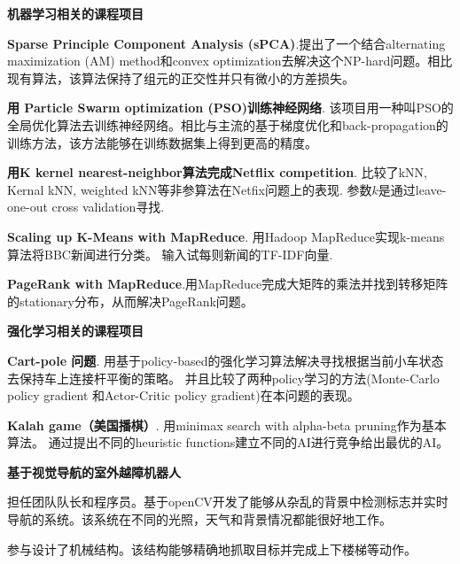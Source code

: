 \documentclass[margin,line,11pt]{resume}
\begin{document}
\begin{resume}
\textbf{机器学习相关的课程项目}
\vspace{0.5 em}
\begin{list2}
\item \textbf{Sparse Principle Component Analysis (sPCA)}.提出了一个结合alternating maximization (AM) method和convex optimization去解决这个NP-hard问题。相比现有算法，该算法保持了组元的正交性并只有微小的方差损失。
\item \textbf{用 Particle Swarm optimization (PSO)训练神经网络}. 该项目用一种叫PSO的全局优化算法去训练神经网络。相比与主流的基于梯度优化和back-propagation的训练方法，该方法能够在训练数据集上得到更高的精度。
\item \textbf{用K kernel nearest-neighbor算法完成Netflix competition}. 比较了kNN, Kernal kNN, weighted kNN等非参算法在Netfix问题上的表现. 参数$k$是通过leave-one-out cross validation寻找. 
\item \textbf{Scaling up K-Means with MapReduce}. 用Hadoop MapReduce实现k-means算法将BBC新闻进行分类。 输入试每则新闻的TF-IDF向量.
\item \textbf{PageRank with MapReduce}.用MapReduce完成大矩阵的乘法并找到转移矩阵的stationary分布，从而解决PageRank问题。
\end{list2}


\textbf{强化学习相关的课程项目}
\vspace{0.5 em}
\begin{list2}        
\item \textbf{Cart-pole 问题}. 用基于policy-based的强化学习算法解决寻找根据当前小车状态去保持车上连接杆平衡的策略。 并且比较了两种policy学习的方法(Monte-Carlo policy gradient 和Actor-Critic policy gradient)在本问题的表现。
\item \textbf{Kalah game（美国播棋）}. 用minimax search with alpha-beta pruning作为基本算法。 通过提出不同的heuristic functions建立不同的AI进行竞争给出最优的AI。
\end{list2}



\textbf{基于视觉导航的室外越障机器人}
\begin{list2}
\item 担任团队队长和程序员。基于openCV开发了能够从杂乱的背景中检测标志并实时导航的系统。该系统在不同的光照，天气和背景情况都能很好地工作。
\item 参与设计了机械结构。该结构能够精确地抓取目标并完成上下楼梯等动作。
\end{list2}






    	

 	

 	       
\end{resume}   
\end{document}
